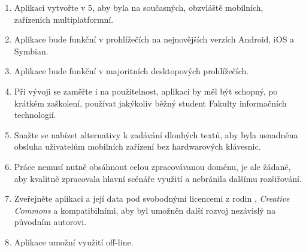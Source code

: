 \begin{enumerate}
 \item Aplikaci vytvořte v 5, aby byla na současných, obzvláště mobilních, zařízeních multiplatformní.
 \item Aplikace bude funkční v prohlížečích na nejnovějších verzích  Android, iOS a Symbian.
 \item Aplikace bude funkční v majoritních desktopových prohlížečích.
 \item Při vývoji se zaměřte i na použitelnost, aplikaci by měl být schopný, po krátkém zaškolení, používat jakýkoliv běžný student Fakulty informačních technologií.
 \item Snažte se nabízet alternativy k zadávání dlouhých textů, aby byla usnadněna obsluha uživatelům mobilních zařízení bez hardwarových klávesnic.
 \item Práce nemusí nutně obsáhnout celou zpracovávanou doménu, je ale žádané, aby kvalitně zpracovala hlavní scénáře využití a nebránila dalšímu rozšiřování.
 \item Zveřejněte aplikaci a její data pod svobodnými licencemi z rodin , \emph{Creative Commons} a kompatibilními, aby byl umožněn další rozvoj nezávislý na původním autorovi.
 \item Aplikace umožní využití off-line. 
\end{enumerate}


